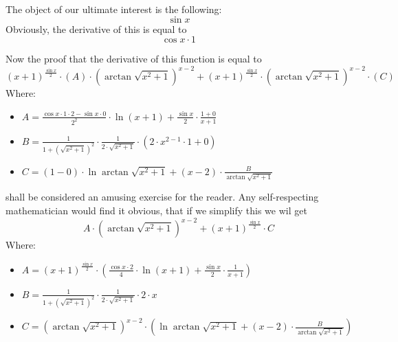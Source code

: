 \documentclass{article}
\begin{document}
The object of our ultimate interest is the following:
\begin{equation}
\sin x 
\end{equation}
Obviously, the derivative of this is equal to
\begin{equation}
\cos x \cdot 1 
\end{equation}

Now the proof that the derivative of this function is equal to
\begin{equation}
\left( x + 1 \right) ^{\frac{\sin x }{2 } } \cdot \left( A \right) \cdot \left( \arctan \sqrt {x ^{2 } + 1 } \right) ^{x - 2 } + \left( x + 1 \right) ^{\frac{\sin x }{2 } } \cdot \left( \arctan \sqrt {x ^{2 } + 1 } \right) ^{x - 2 } \cdot \left( C \right) 
\end{equation}
Where:
\begin{itemize}
	\item $A = \frac{\cos x \cdot 1 \cdot 2 - \sin x \cdot 0 }{2 ^{2 } } \cdot \ln \left( x + 1 \right) + \frac{\sin x }{2 } \cdot \frac{1 + 0 }{x + 1 } $
	\item $B = \frac{1 }{1 + \left( \sqrt {x ^{2 } + 1 } \right) ^{2 } } \cdot \frac{1 }{2 \cdot \sqrt {x ^{2 } + 1 } } \cdot \left( 2 \cdot x ^{2 - 1 } \cdot 1 + 0 \right) $
	\item $C = \left( 1 - 0 \right) \cdot \ln \arctan \sqrt {x ^{2 } + 1 } + \left( x - 2 \right) \cdot \frac{B }{\arctan \sqrt {x ^{2 } + 1 } } $
\end{itemize}

shall be considered an amusing exercise for the reader.
Any self-respecting mathematician would find it obvious, that if we simplify this we wil get
\begin{equation}
A \cdot \left( \arctan \sqrt {x ^{2 } + 1 } \right) ^{x - 2 } + \left( x + 1 \right) ^{\frac{\sin x }{2 } } \cdot C 
\end{equation}
Where:
\begin{itemize}
	\item $A = \left( x + 1 \right) ^{\frac{\sin x }{2 } } \cdot \left( \frac{\cos x \cdot 2 }{4 } \cdot \ln \left( x + 1 \right) + \frac{\sin x }{2 } \cdot \frac{1 }{x + 1 } \right) $
	\item $B = \frac{1 }{1 + \left( \sqrt {x ^{2 } + 1 } \right) ^{2 } } \cdot \frac{1 }{2 \cdot \sqrt {x ^{2 } + 1 } } \cdot 2 \cdot x $
	\item $C = \left( \arctan \sqrt {x ^{2 } + 1 } \right) ^{x - 2 } \cdot \left( \ln \arctan \sqrt {x ^{2 } + 1 } + \left( x - 2 \right) \cdot \frac{B }{\arctan \sqrt {x ^{2 } + 1 } } \right) $
\end{itemize}
\end{document}
